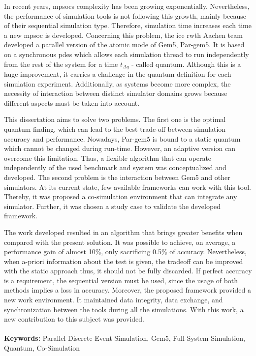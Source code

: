 





\vspace*{-0.5cm}

In recent years, \glspl{mpsoc} complexity has been growing exponentially. Nevertheless, the performance of simulation tools is not 
following this growth, mainly because of their sequential simulation type. Therefore, simulation time increases each time a new \gls{mpsoc} 
is developed. Concerning this problem, the \gls{ice} \gls{rwth} Aachen team developed a parallel version of the atomic mode of Gem5, Par-gem5. 
It is based on a synchronous \gls{pdes} which allows each simulation thread to run independently from the rest of the system for a time 
$t_{\Delta q}$ - called quantum. Although this is a huge improvement, it carries a challenge in the quantum definition for each simulation experiment. 
Additionally, as systems become more complex, the necessity of interaction between distinct simulator domains grows because different aspects 
must be taken into account. 

This dissertation aims to solve two problems. The first one is the optimal quantum finding, which can lead to the best trade-off between 
simulation accuracy and performance. Nowadays, Par-gem5 is bound to a static quantum which cannot be changed during run-time. However, an adaptive 
version can overcome this limitation. Thus, a flexible algorithm that can operate independently of the used benchmark and system was conceptualized and 
developed. The second problem is the interaction between Gem5 and other simulators. At its current state, few available 
frameworks can work with this tool. Thereby, it was proposed a co-simulation environment that can integrate any 
simulator. Further, it was chosen a study case to validate the developed framework.

The work developed resulted in an algorithm that brings greater benefits when compared with the present solution. It was possible to achieve, 
on average, a performance gain of almost 10\%, only sacrificing 0.5\% of accuracy. Nevertheless, when a-priori information about the 
test is given, the tradeoff can be improved with the static approach thus, it should not be fully discarded. 
If perfect accuracy is a requirement, the sequential version must be used, since the usage of both methods implies a loss in accuracy. 
Moreover, the proposed framework provided a new work environment. It maintained data integrity, data exchange, and synchronization 
between the tools during all the simulations. With this work, a new contribution to this subject was provided.

\paragraph{}\textbf{Keywords:} Parallel Discrete Event Simulation, Gem5, Full-System Simulation, Quantum, Co-Simulation
